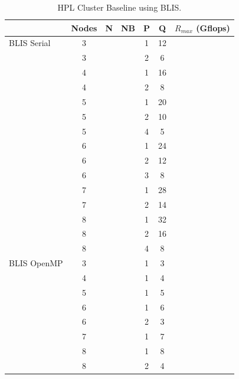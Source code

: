 \documentclass{report}
\begin{document}
\begin{table}
\begin{center}
\begin{tabular}{ |l|c|c|c|c|c|c| } 
\hline
                & Nodes & N & NB & P & Q & $R_{max}$ (Gflops) \\ 
\hline
BLIS Serial     & 3 & & & 1 & 12 & \\ 
                & 3 & & & 2 &  6 & \\ 
                \cline{2-7} 
                & 4 & & & 1 & 16 & \\ 
                & 4 & & & 2 &  8 & \\ 
                \cline{2-7} 
                & 5 & & & 1 & 20 & \\ 
                & 5 & & & 2 & 10 & \\ 
                & 5 & & & 4 &  5 & \\ 
                \cline{2-7} 
                & 6 & & & 1 & 24 & \\ 
                & 6 & & & 2 & 12 & \\ 
                & 6 & & & 3 &  8 & \\ 
                \cline{2-7} 
                & 7 & & & 1 & 28 & \\ 
                & 7 & & & 2 & 14 & \\ 
                \cline{2-7} 
                & 8 & & & 1 & 32 & \\ 
                & 8 & & & 2 & 16 & \\ 
                & 8 & & & 4 &  8 & \\ 
\hline
BLIS OpenMP     & 3 & & & 1 & 3  & \\ 
                \cline{2-7} 
                & 4 & & & 1 & 4  & \\ 
                \cline{2-7} 
                & 5 & & & 1 & 5  & \\ 
                \cline{2-7} 
                & 6 & & & 1 & 6  & \\ 
                & 6 & & & 2 & 3  & \\ 
                \cline{2-7} 
                & 7 & & & 1 & 7  & \\ 
                \cline{2-7} 
                & 8 & & & 1 & 8  & \\ 
                & 8 & & & 2 & 4  & \\ 
\hline
\end{tabular}
\end{center}
\caption{\label{tab:table-name}HPL Cluster Baseline using BLIS.}
\end{table}
\end{document}
